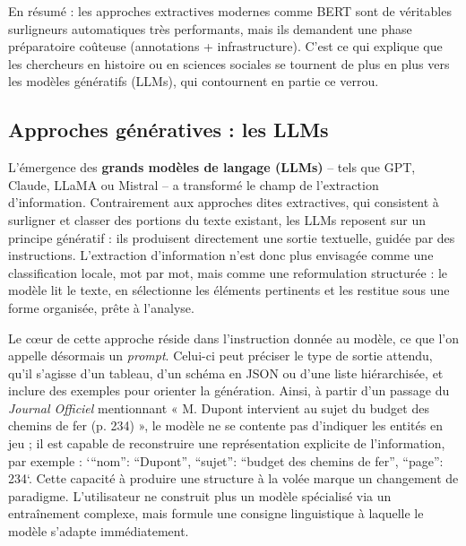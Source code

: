 En résumé : les approches extractives modernes comme BERT sont de véritables surligneurs automatiques très performants, mais ils demandent une phase préparatoire coûteuse (annotations + infrastructure). C’est ce qui explique que les chercheurs en histoire ou en sciences sociales se tournent de plus en plus vers les modèles génératifs (LLMs), qui contournent en partie ce verrou.

\subsection{Approches génératives : les LLMs}

L’émergence des \textbf{grands modèles de langage (LLMs)} – tels que GPT, Claude, LLaMA ou Mistral – a transformé le champ de l’extraction d’information. Contrairement aux approches dites extractives, qui consistent à surligner et classer des portions du texte existant, les LLMs reposent sur un principe génératif : ils produisent directement une sortie textuelle, guidée par des instructions. L’extraction d’information n’est donc plus envisagée comme une classification locale, mot par mot, mais comme une reformulation structurée : le modèle lit le texte, en sélectionne les éléments pertinents et les restitue sous une forme organisée, prête à l’analyse.

Le cœur de cette approche réside dans l’instruction donnée au modèle, ce que l’on appelle désormais un \emph{prompt}. Celui-ci peut préciser le type de sortie attendu, qu’il s’agisse d’un tableau, d’un schéma en JSON ou d’une liste hiérarchisée, et inclure des exemples pour orienter la génération. Ainsi, à partir d’un passage du \emph{Journal Officiel} mentionnant « M. Dupont intervient au sujet du budget des chemins de fer (p. 234) », le modèle ne se contente pas d’indiquer les entités en jeu ; il est capable de reconstruire une représentation explicite de l’information, par exemple : `{\enquote{nom}: \enquote{Dupont}, \enquote{sujet}: \enquote{budget des chemins de fer}, \enquote{page}: 234}`. Cette capacité à produire une structure à la volée marque un changement de paradigme. L’utilisateur ne construit plus un modèle spécialisé via un entraînement complexe, mais formule une consigne linguistique à laquelle le modèle s’adapte immédiatement.

